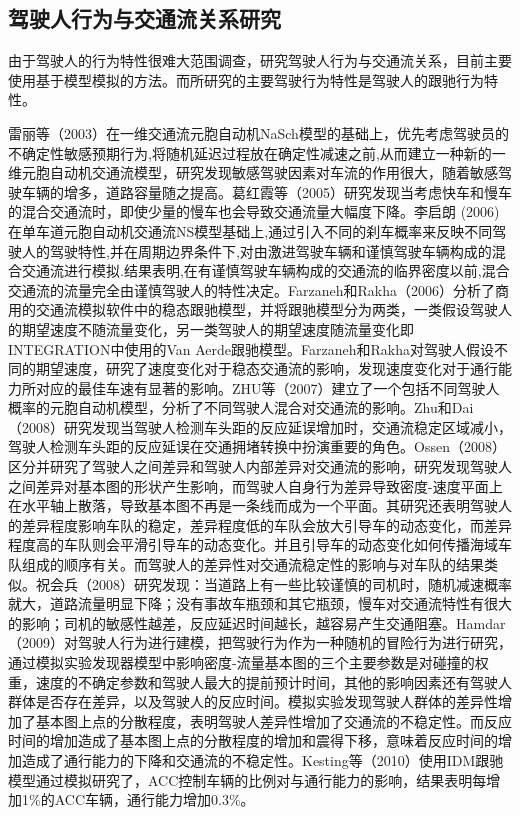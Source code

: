 \subsection{驾驶人行为与交通流关系研究}
由于驾驶人的行为特性很难大范围调查，研究驾驶人行为与交通流关系，目前主要使用基于模型模拟的方法。而所研究的主要驾驶行为特性是驾驶人的跟驰行为特性。

雷丽等（2003）在一维交通流元胞自动机NaSch模型的基础上，优先考虑驾驶员的不确定性敏感预期行为,将随机延迟过程放在确定性减速之前,从而建立一种新的一维元胞自动机交通流模型，研究发现敏感驾驶因素对车流的作用很大，随着敏感驾驶车辆的增多，道路容量随之提高\cite{雷丽2003}。葛红霞等（2005）研究发现当考虑快车和慢车的混合交通流时，即使少量的慢车也会导致交通流量大幅度下降\cite{葛红霞2005}。李启朗 (2006) 在单车道元胞自动机交通流NS模型基础上,通过引入不同的刹车概率来反映不同驾驶人的驾驶特性,并在周期边界条件下,对由激进驾驶车辆和谨慎驾驶车辆构成的混合交通流进行模拟.结果表明,在有谨慎驾驶车辆构成的交通流的临界密度以前,混合交通流的流量完全由谨慎驾驶人的特性决定\cite{李启朗2006}。Farzaneh和Rakha（2006）分析了商用的交通流模拟软件中的稳态跟驰模型，并将跟驰模型分为两类，一类假设驾驶人的期望速度不随流量变化，另一类驾驶人的期望速度随流量变化即INTEGRATION中使用的Van Aerde跟驰模型。Farzaneh和Rakha对驾驶人假设不同的期望速度，研究了速度变化对于稳态交通流的影响，发现速度变化对于通行能力所对应的最佳车速有显著的影响\cite{Farzaneh2006}。ZHU等（2007）建立了一个包括不同驾驶人概率的元胞自动机模型，分析了不同驾驶人混合对交通流的影响\cite{H.B.ZHU2007}。Zhu和Dai（2008）研究发现当驾驶人检测车头距的反应延误增加时，交通流稳定区域减小，驾驶人检测车头距的反应延误在交通拥堵转换中扮演重要的角色\cite{Zhu2008}。Ossen（2008）区分并研究了驾驶人之间差异和驾驶人内部差异对交通流的影响，研究发现驾驶人之间差异对基本图的形状产生影响，而驾驶人自身行为差异导致密度-速度平面上在水平轴上散落，导致基本图不再是一条线而成为一个平面。其研究还表明驾驶人的差异程度影响车队的稳定，差异程度低的车队会放大引导车的动态变化，而差异程度高的车队则会平滑引导车的动态变化。并且引导车的动态变化如何传播海域车队组成的顺序有关。而驾驶人的差异性对交通流稳定性的影响与对车队的结果类似\cite{Ossen2008}。祝会兵（2008）研究发现：当道路上有一些比较谨慎的司机时，随机减速概率就大，道路流量明显下降；没有事故车瓶颈和其它瓶颈，慢车对交通流特性有很大的影响；司机的敏感性越差，反应延迟时间越长，越容易产生交通阻塞\cite{祝会兵2008}。Hamdar（2009）对驾驶人行为进行建模，把驾驶行为作为一种随机的冒险行为进行研究，通过模拟实验发现器模型中影响密度-流量基本图的三个主要参数是对碰撞的权重，速度的不确定参数和驾驶人最大的提前预计时间，其他的影响因素还有驾驶人群体是否存在差异，以及驾驶人的反应时间。模拟实验发现驾驶人群体的差异性增加了基本图上点的分散程度，表明驾驶人差异性增加了交通流的不稳定性。而反应时间的增加造成了基本图上点的分散程度的增加和震得下移，意味着反应时间的增加造成了通行能力的下降和交通流的不稳定性\cite{Hamdar2009a}。Kesting等（2010）使用IDM跟驰模型通过模拟研究了，ACC控制车辆的比例对与通行能力的影响，结果表明每增加1\%的ACC车辆，通行能力增加0.3\%\cite{Kesting2010}。

